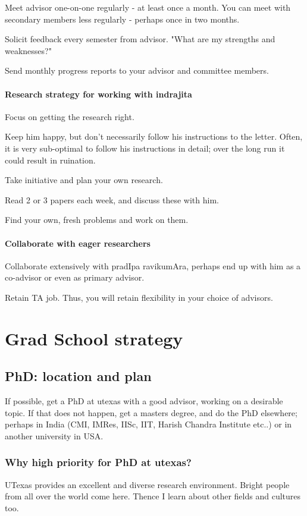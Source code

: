 \documentclass[oneside, article]{memoir}
\begin{document}
Meet advisor one-on-one regularly - at least once a month. You can meet with secondary members less regularly - perhaps once in two months.

Solicit feedback every semester from advisor. "What are my strengths and weaknesses?"

Send monthly progress reports to your advisor and committee members.

\subsection{Research strategy for working with indrajita}
Focus on getting the research right.

Keep him happy, but don't necessarily follow his instructions to the letter. Often, it is very sub-optimal to follow his instructions in detail; over the long run it could result in ruination.

Take initiative and plan your own research.

Read 2 or 3 papers each week, and discuss these with him.

Find your own, fresh problems and work on them.

\subsection{Collaborate with eager researchers}
Collaborate extensively with pradIpa ravikumAra, perhaps end up with him as a co-advisor or even as primary advisor.

Retain TA job. Thus, you will retain flexibility in your choice of advisors.

\part{Grad School strategy}
\chapter{PhD: location and plan}
If possible, get a PhD at utexas with a good advisor, working on a desirable topic. If that does not happen, get a masters degree, and do the PhD elsewhere; perhaps in India (CMI, IMRes, IISc, IIT, Harish Chandra Institute etc..) or in another university in USA.

\section{Why high priority for PhD at utexas?}
UTexas provides an excellent and diverse research environment. Bright people from all over the world come here. Thence I learn about other fields and cultures too.
\end{document}

